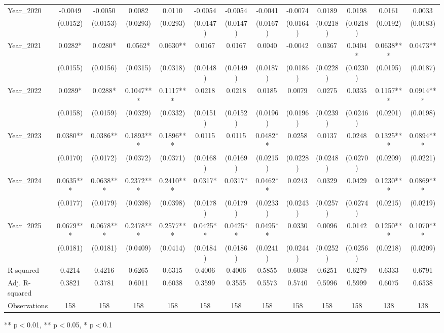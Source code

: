 \begin{table}[htbp]
\begin{tabular}{lcccccccccccc}
Year\_2020 & -0.0049 & -0.0050 & 0.0082 & 0.0110 & -0.0054 & -0.0054 & -0.0041 & -0.0074 & 0.0189 & 0.0198 & 0.0161 & 0.0033 \\
 & (0.0152) & (0.0153) & (0.0293) & (0.0293) & (0.0147) & (0.0147) & (0.0167) & (0.0164) & (0.0218) & (0.0218) & (0.0192) & (0.0183) \\
Year\_2021 & 0.0282* & 0.0280* & 0.0562* & 0.0630** & 0.0167 & 0.0167 & 0.0040 & -0.0042 & 0.0367 & 0.0404* & 0.0638*** & 0.0473** \\
 & (0.0155) & (0.0156) & (0.0315) & (0.0318) & (0.0148) & (0.0149) & (0.0187) & (0.0186) & (0.0228) & (0.0230) & (0.0195) & (0.0187) \\
Year\_2022 & 0.0289* & 0.0288* & 0.1047*** & 0.1117*** & 0.0218 & 0.0218 & 0.0185 & 0.0079 & 0.0275 & 0.0335 & 0.1157*** & 0.0914*** \\
 & (0.0158) & (0.0159) & (0.0329) & (0.0332) & (0.0151) & (0.0152) & (0.0196) & (0.0196) & (0.0239) & (0.0246) & (0.0201) & (0.0198) \\
Year\_2023 & 0.0380** & 0.0386** & 0.1893*** & 0.1896*** & 0.0115 & 0.0115 & 0.0482** & 0.0258 & 0.0137 & 0.0248 & 0.1325*** & 0.0894*** \\
 & (0.0170) & (0.0172) & (0.0372) & (0.0371) & (0.0168) & (0.0169) & (0.0215) & (0.0228) & (0.0248) & (0.0270) & (0.0209) & (0.0221) \\
Year\_2024 & 0.0635*** & 0.0638*** & 0.2372*** & 0.2410*** & 0.0317* & 0.0317* & 0.0462** & 0.0243 & 0.0329 & 0.0429 & 0.1230*** & 0.0869*** \\
 & (0.0177) & (0.0179) & (0.0398) & (0.0398) & (0.0178) & (0.0179) & (0.0233) & (0.0243) & (0.0257) & (0.0274) & (0.0215) & (0.0219) \\
Year\_2025 & 0.0679*** & 0.0678*** & 0.2478*** & 0.2577*** & 0.0425** & 0.0425** & 0.0495** & 0.0330 & 0.0096 & 0.0142 & 0.1250*** & 0.1070*** \\
 & (0.0181) & (0.0181) & (0.0409) & (0.0414) & (0.0184) & (0.0186) & (0.0241) & (0.0244) & (0.0252) & (0.0256) & (0.0218) & (0.0209) \\
\hline
R-squared & 0.4214 & 0.4216 & 0.6265 & 0.6315 & 0.4006 & 0.4006 & 0.5855 & 0.6038 & 0.6251 & 0.6279 & 0.6333 & 0.6791 \\
Adj. R-squared & 0.3821 & 0.3781 & 0.6011 & 0.6038 & 0.3599 & 0.3555 & 0.5573 & 0.5740 & 0.5996 & 0.5999 & 0.6075 & 0.6538 \\
Observations & 158 & 158 & 158 & 158 & 158 & 158 & 158 & 158 & 158 & 158 & 138 & 138 \\
\hline\hline
\end{tabular}
\begin{tablenotes}[flushleft]
\footnotesize
\item *** p$<$0.01, ** p$<$0.05, * p$<$0.1
\end{tablenotes}
\end{table}
